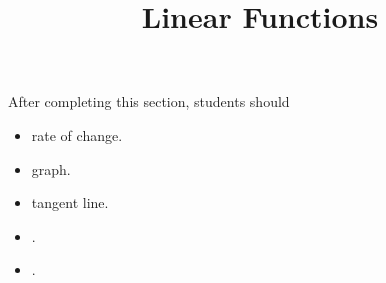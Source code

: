 \documentclass{ximera}
\title{Linear Functions}
\begin{document}
\begin{abstract}
\end{abstract}
\maketitle

\begin{sectionOutcomes}
After completing this section, students should 

\begin{itemize}
\item rate of change.
\item graph.
\item tangent line.
\item .
\item .
\end{itemize}
\end{sectionOutcomes}
\end{document}
